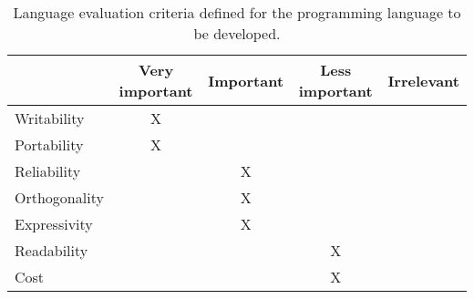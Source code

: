 \begin{table}[htbp]
\centering
\begin{tabular}{|l|c|c|c|c|}
\hline
& Very important & Important & Less important & Irrelevant \\ \hline
Writability & X & & & \\ \hline
Portability & X & & & \\ \hline
Reliability & & X & & \\ \hline
Orthogonality & & X & & \\ \hline
Expressivity & & X & & \\ \hline
Readability & & & X & \\ \hline
Cost & & & X & \\ \hline
\end{tabular}
\caption{Language evaluation criteria defined for the programming language to be developed.}
\label{tbl:evaluation criteria result}
\end{table}